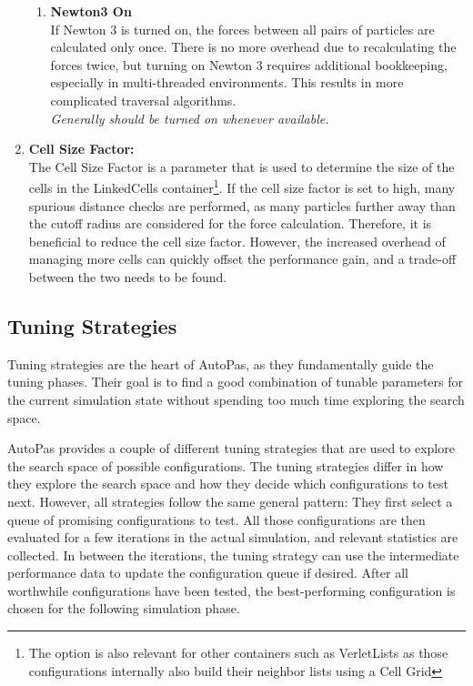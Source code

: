 \begin{enumerate}[label=\textbf{\arabic*.}]
\begin{enumerate}
                  \item \textbf{Newton3 On} \\
                        If Newton 3 is turned on, the forces between all pairs of particles are calculated only once. There is no more overhead due to recalculating the forces twice, but turning on Newton 3 requires additional bookkeeping, especially in multi-threaded environments. This results in more complicated traversal algorithms.\\
                        \textit{Generally should be turned on whenever available.}
            \end{enumerate}

      \item \textbf{Cell Size Factor:} \\
            The Cell Size Factor is a parameter that is used to determine the size of the cells in the LinkedCells container\footnote{The option is also relevant for other containers such as VerletLists as those configurations internally also build their neighbor lists using a Cell Grid}. If the cell size factor is set to high, many spurious distance checks are performed, as many particles further away than the cutoff radius are considered for the force calculation. Therefore, it is beneficial to reduce the cell size factor. However, the increased overhead of managing more cells can quickly offset the performance gain, and a trade-off between the two needs to be found.\\

\end{enumerate}

\subsection{Tuning Strategies}

Tuning strategies are the heart of AutoPas, as they fundamentally guide the tuning phases. Their goal is to find a good combination of tunable parameters for the current simulation state without spending too much time exploring the search space.

AutoPas provides a couple of different tuning strategies that are used to explore the search space of possible configurations. The tuning strategies differ in how they explore the search space and how they decide which configurations to test next. However, all strategies follow the same general pattern: They first select a queue of promising configurations to test. All those configurations are then evaluated for a few iterations in the actual simulation, and relevant statistics are collected. In between the iterations, the tuning strategy can use the intermediate performance data to update the configuration queue if desired. After all worthwhile configurations have been tested, the best-performing configuration is chosen for the following simulation phase.

